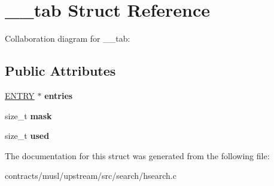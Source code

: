 \hypertarget{struct____tab}{}\section{\+\_\+\+\_\+tab Struct Reference}
\label{struct____tab}


Collaboration diagram for \+\_\+\+\_\+tab\+:
\subsection*{Public Attributes}
\begin{DoxyCompactItemize}
\item 
\mbox{\label{struct____tab_ae7008c59bd1ce90c0a58344fa4e8653f}} 
\mbox{\hyperlink{structentry}{E\+N\+T\+RY}} $\ast$ {\bfseries entries}
\item 
\mbox{\label{struct____tab_a86001d96518b9e2ecbb3e5a64808a641}} 
size\+\_\+t {\bfseries mask}
\item 
\mbox{\label{struct____tab_a41bd968e7227e67d33ed76a794991462}} 
size\+\_\+t {\bfseries used}
\end{DoxyCompactItemize}


The documentation for this struct was generated from the following file\+:\begin{DoxyCompactItemize}
\item 
contracts/musl/upstream/src/search/hsearch.\+c\end{DoxyCompactItemize}
